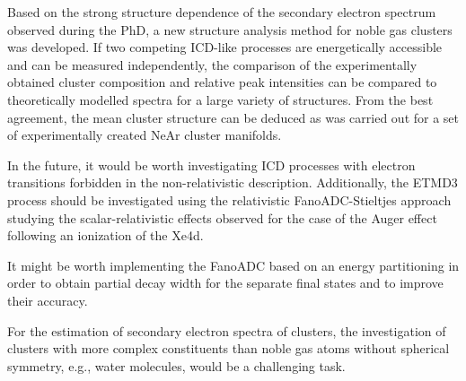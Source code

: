 Based on the strong structure dependence of the secondary electron spectrum
observed during the PhD, a new
structure analysis method for noble gas clusters was developed. If two
competing ICD-like processes are energetically accessible and can be measured
independently, the comparison of the experimentally obtained cluster
composition and relative peak intensities can be compared to theoretically
modelled spectra for a large variety of structures. From the best agreement,
the mean cluster structure can be deduced as was carried out for
a set of experimentally created NeAr cluster manifolds.

In the future, it would be worth investigating \ac{ICD} processes with electron
transitions forbidden in the non-relativistic description.
Additionally, the ETMD3 process should be investigated using the relativistic
FanoADC-Stieltjes approach studying the scalar-relativistic effects observed
for the case of the Auger effect following an ionization of the Xe4d.

It might be worth implementing the FanoADC based on an energy partitioning in
order to obtain partial decay width for the separate final states and to
improve their accuracy.

For the estimation of secondary electron spectra of clusters,
the investigation of clusters with more complex
constituents than noble gas atoms without spherical symmetry,
e.g., water molecules, would be a challenging task.
